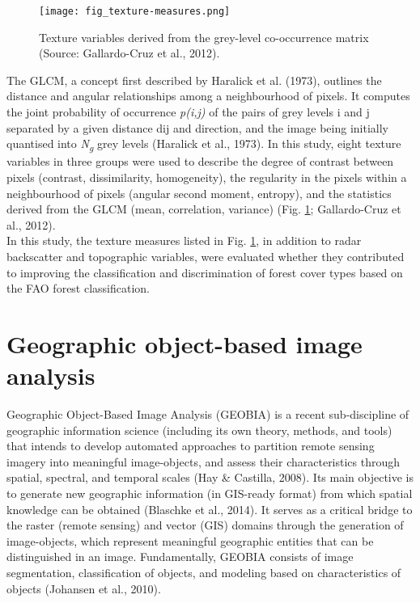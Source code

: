 \begin{figure}
	\centering
	\texttt{[image: fig\_texture-measures.png]}
	\caption[Texture variables derived from the grey-level co-occurrence matrix.]{Texture variables derived from the grey-level co-occurrence matrix (Source: Gallardo-Cruz et al., 2012).}
	\label{fig: litrev-fig2.4}
\end{figure}

The GLCM, a concept first described by Haralick et al. (1973), outlines the distance and angular relationships among a neighbourhood of pixels. It computes the joint probability of occurrence \textit{p(i,j)} of the pairs of grey levels i and j separated by a given distance dij and direction, and the image being initially quantised into \textit{N\textsubscript{g}} grey levels (Haralick et al., 1973). In this study, eight texture variables in three groups were used to describe the degree of contrast between pixels (contrast, dissimilarity, homogeneity), the regularity in the pixels within a neighbourhood of pixels (angular second moment, entropy), and the statistics derived from the GLCM (mean, correlation, variance) (Fig. \ref{fig: litrev-fig2.4}; Gallardo-Cruz et al., 2012).\\

In this study, the texture measures listed in Fig. \ref{fig: litrev-fig2.4}, in addition to radar backscatter and topographic variables, were evaluated whether they contributed to improving the classification and discrimination of forest cover types based on the FAO forest classification.

\section{Geographic object-based image analysis}
\label{sec: litrev-geobia}

Geographic Object-Based Image Analysis (GEOBIA) is a recent sub-discipline of geographic information science (including its own theory, methods, and tools) that intends to develop automated approaches to partition remote sensing imagery into meaningful image-objects, and assess their characteristics through spatial, spectral, and temporal scales (Hay \& Castilla, 2008). Its main objective is to generate new geographic information (in GIS-ready format) from which spatial knowledge can be obtained (Blaschke et al., 2014). It serves as a critical bridge to the raster (remote sensing) and vector (GIS) domains through the generation of image-objects, which represent meaningful geographic entities that can be distinguished in an image. Fundamentally, GEOBIA consists of image segmentation, classification of objects, and modeling based on characteristics of objects (Johansen et al., 2010).

